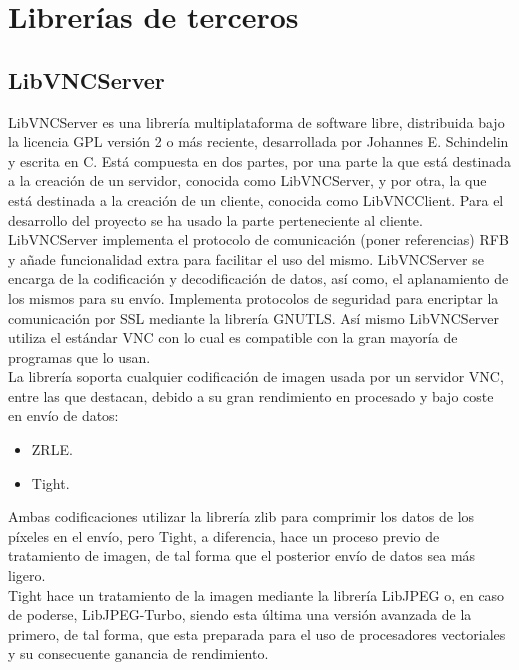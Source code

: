 \section{Librerías de terceros}
\subsection{LibVNCServer}
LibVNCServer es una librería multiplataforma de software libre, distribuida bajo la licencia GPL versión 2 o más reciente, desarrollada por Johannes E. Schindelin y escrita en C. Está compuesta en dos partes, por una parte la que está destinada a la creación de un servidor, conocida como LibVNCServer, y por otra, la que está destinada a la creación de un cliente, conocida como LibVNCClient. Para el desarrollo del proyecto se ha usado la parte perteneciente al cliente.\\

LibVNCServer implementa el protocolo de comunicación (poner referencias) RFB y añade funcionalidad extra para facilitar el uso del mismo. LibVNCServer se encarga de la codificación y decodificación de datos, así como, el aplanamiento de los mismos para su envío. Implementa protocolos de seguridad para encriptar la comunicación por SSL mediante la librería GNUTLS. Así mismo LibVNCServer utiliza el estándar VNC con lo cual es compatible con la gran mayoría de programas que lo usan.\\

La librería soporta cualquier codificación de imagen usada por un servidor VNC, entre las que destacan, debido a su gran rendimiento en procesado y bajo coste en envío de datos:
\begin{itemize}
\item ZRLE.
\item Tight.
\end{itemize}

Ambas codificaciones utilizar la librería zlib para comprimir los datos de los píxeles en el envío, pero Tight, a diferencia, hace un proceso previo de tratamiento de imagen, de tal forma que el posterior envío de datos sea más ligero.\\

Tight hace un tratamiento de la imagen mediante la librería LibJPEG o, en caso de poderse, LibJPEG-Turbo, siendo esta última una versión avanzada de la primero, de tal forma, que esta preparada para el uso de procesadores vectoriales y su consecuente ganancia de rendimiento.\\

